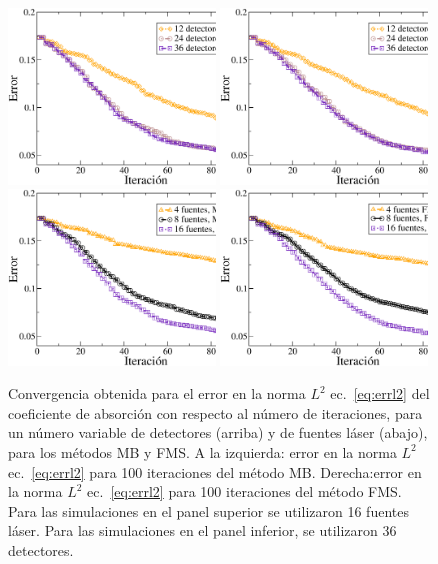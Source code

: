 \begin{figure}[h!]
\centering
  \includegraphics[width=0.49\textwidth]{figuras/detsSweep.eps}
  \includegraphics[width=0.49\textwidth]{figuras/detsMSS.eps}
\\
    \vspace{0.3cm}
  \includegraphics[width=0.49\textwidth]{figuras/sourcesSweep.eps}
  \includegraphics[width=0.49\textwidth]{figuras/sourcesMSS.eps}
  \caption{Convergencia obtenida para el error en la norma $L^2$ ec.~\eqref{eq:errl2} 
  del coeficiente de absorción con respecto al número de iteraciones, 
  para un número variable de detectores (arriba) y de fuentes láser (abajo), para los métodos 
  MB y FMS. 
   A la izquierda: 
  error en la norma $L^2$ ec.~\eqref{eq:errl2} para 100 iteraciones del método MB. 
  Derecha:error en la norma $L^2$ ec.~\eqref{eq:errl2} para 100 iteraciones del método FMS. 
  Para las simulaciones en el panel superior se utilizaron 16 fuentes láser. Para 
  las simulaciones en el panel inferior, se utilizaron 36 detectores.}
 \label{fig:itdet}
\end{figure}


